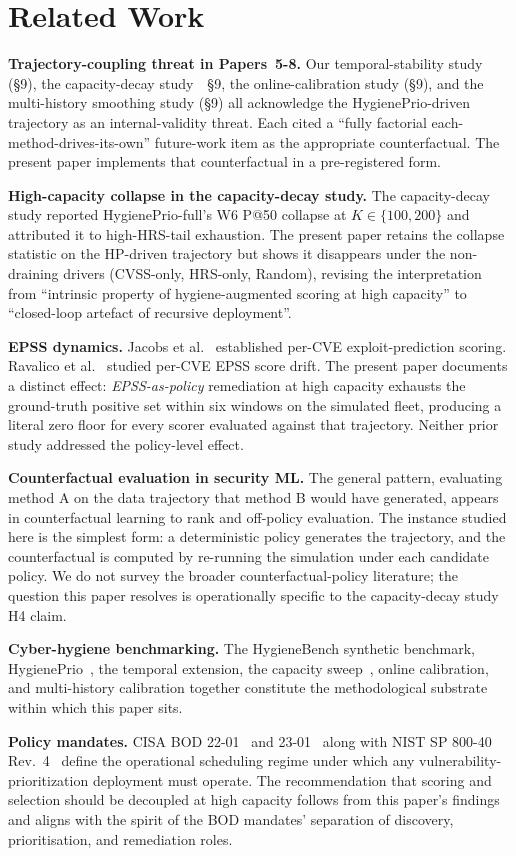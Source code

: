 \section{Related Work}

\textbf{Trajectory-coupling threat in Papers~5-8.}
Our temporal-stability study (§9), the capacity-decay study~\cite{paper6capacity}~§9,
the online-calibration study (§9), and the multi-history smoothing study (§9) all
acknowledge the HygienePrio-driven trajectory as an internal-validity
threat. Each cited a ``fully factorial each-method-drives-its-own''
future-work item as the appropriate counterfactual. The present paper
implements that counterfactual in a pre-registered form.

\textbf{High-capacity collapse in the capacity-decay study.} The capacity-decay study reported
HygienePrio-full's W6 P@50 collapse at $K \in \{100, 200\}$ and
attributed it to high-HRS-tail exhaustion. The present paper retains
the collapse statistic on the HP-driven trajectory but shows it
disappears under the non-draining drivers (CVSS-only, HRS-only,
Random), revising the interpretation from
``intrinsic property of hygiene-augmented scoring at high capacity''
to ``closed-loop artefact of recursive deployment''.

\textbf{EPSS dynamics.} Jacobs et al.~\cite{jacobs2021epss,jacobs2020improving}
established per-CVE exploit-prediction scoring. Ravalico
et al.~\cite{ravalico2025epsstemporal} studied per-CVE EPSS score drift.
The present paper documents a distinct effect: \textit{EPSS-as-policy}
remediation at high capacity exhausts the ground-truth positive set
within six windows on the simulated fleet, producing a literal zero
floor for every scorer evaluated against that trajectory. Neither prior
study addressed the policy-level effect.

\textbf{Counterfactual evaluation in security ML.} The general pattern,
evaluating method A on the data trajectory that method B would
have generated, appears in counterfactual learning to rank and
off-policy evaluation. The instance studied here is the simplest
form: a deterministic policy generates the trajectory, and the
counterfactual is computed by re-running the simulation under each
candidate policy. We do not survey the broader counterfactual-policy
literature; the question this paper resolves is operationally specific
to the capacity-decay study H4 claim.

\textbf{Cyber-hygiene benchmarking.} The HygieneBench synthetic benchmark,
HygienePrio~\cite{paper4hygieneprio}, the temporal extension,
the capacity sweep~\cite{paper6capacity}, online calibration,
and multi-history calibration together constitute
the methodological substrate within which this paper sits.

\textbf{Policy mandates.}
CISA BOD 22-01~\cite{cisa2021bod2201} and 23-01~\cite{cisa2022bod2301}
along with NIST SP 800-40 Rev.~4~\cite{nist2022sp80040r4} define the
operational scheduling regime under which any vulnerability-prioritization
deployment must operate. The recommendation that scoring and selection
should be decoupled at high capacity follows from this paper's
findings and aligns with the spirit of the BOD mandates' separation of
discovery, prioritisation, and remediation roles.

